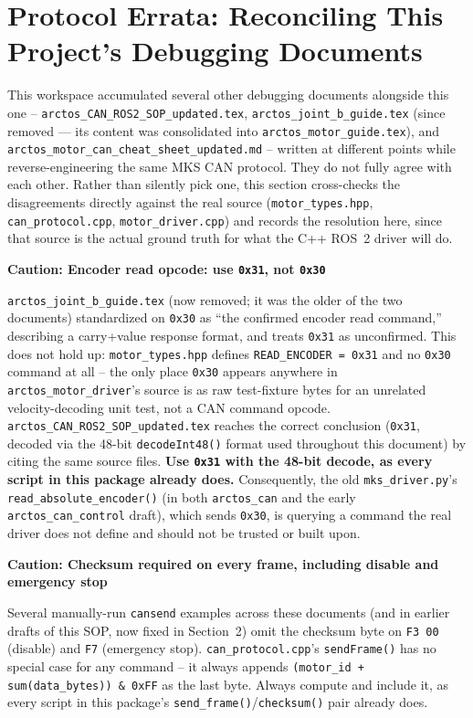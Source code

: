 \documentclass[11pt,letterpaper]{article}
\newenvironment{caution}[1]{%
    \par\addvspace{8pt}%
    \noindent{\color{cautionred}\rule{\linewidth}{0.8pt}}\par\vspace{2pt}
    \noindent\textbf{\color{cautionred}Caution: #1}\par\vspace{2pt}
}{%
    \par\vspace{2pt}\noindent{\color{cautionred}\rule{\linewidth}{0.4pt}}%
    \par\addvspace{8pt}%
}
\begin{document}
\section{Protocol Errata: Reconciling This Project's Debugging Documents}
\label{sec:errata}
This workspace accumulated several other debugging documents alongside this one -- \texttt{arctos\_CAN\_ROS2\_SOP\_updated.tex}, \texttt{arctos\_joint\_b\_guide.tex} (since removed --- its content was consolidated into \texttt{arctos\_motor\_guide.tex}), and \texttt{arctos\_motor\_can\_cheat\_sheet\_updated.md} -- written at different points while reverse-engineering the same MKS CAN protocol. They do not fully agree with each other. Rather than silently pick one, this section cross-checks the disagreements directly against the real source (\texttt{motor\_types.hpp}, \texttt{can\_protocol.cpp}, \texttt{motor\_driver.cpp}) and records the resolution here, since that source is the actual ground truth for what the C++ ROS~2 driver will do.

\begin{caution}{Encoder read opcode: use \texttt{0x31}, not \texttt{0x30}}
\texttt{arctos\_joint\_b\_guide.tex} (now removed; it was the older of the two documents) standardized on \texttt{0x30} as ``the confirmed encoder read command,'' describing a carry+value response format, and treats \texttt{0x31} as unconfirmed. This does not hold up: \texttt{motor\_types.hpp} defines \texttt{READ\_ENCODER = 0x31} and no \texttt{0x30} command at all -- the only place \texttt{0x30} appears anywhere in \texttt{arctos\_motor\_driver}'s source is as raw test-fixture bytes for an unrelated velocity-decoding unit test, not a CAN command opcode. \texttt{arctos\_CAN\_ROS2\_SOP\_updated.tex} reaches the correct conclusion (\texttt{0x31}, decoded via the 48-bit \texttt{decodeInt48()} format used throughout this document) by citing the same source files. \textbf{Use \texttt{0x31} with the 48-bit decode, as every script in this package already does.} Consequently, the old \texttt{mks\_driver.py}'s \texttt{read\_absolute\_encoder()} (in both \texttt{arctos\_can} and the early \texttt{arctos\_can\_control} draft), which sends \texttt{0x30}, is querying a command the real driver does not define and should not be trusted or built upon.
\end{caution}

\begin{caution}{Checksum required on every frame, including disable and emergency stop}
Several manually-run \texttt{cansend} examples across these documents (and in earlier drafts of this SOP, now fixed in Section~2) omit the checksum byte on \texttt{F3 00} (disable) and \texttt{F7} (emergency stop). \texttt{can\_protocol.cpp}'s \texttt{sendFrame()} has no special case for any command -- it always appends \texttt{(motor\_id + sum(data\_bytes)) \& 0xFF} as the last byte. Always compute and include it, as every script in this package's \texttt{send\_frame()}/\texttt{checksum()} pair already does.
\end{caution}
\end{document}
